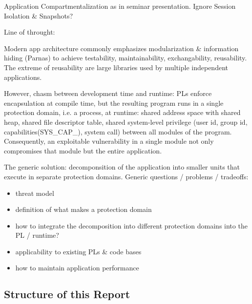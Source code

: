 \documentclass[10pt,twocolumn,letter]{article}
\begin{document}
Application Compartmentalization as in seminar presentation. Ignore Session Isolation \& Snapshots?

Line of throught:

Modern app architecture commonly emphasizes modularization \& information hiding (Parnas) to achieve testability, maintainability, exchangability, reusability.
The extreme of reusability are large libraries used by multiple independent applications.

However, chasm between development time and runtime:
PLs enforce encapsulation at compile time, but the resulting program runs in a single protection domain, i.e. a process, at runtime:
shared address space with shared heap, shared file descriptor table, shared system-level privilege (user id, group id, capabilities(SYS\_CAP\_), system call) between all modules of the program.
Consequently, an exploitable vulnerability in a single module not only compromises that module but the entire application.

The generic solution: decomponsition of the application into smaller units that execute in separate protection domains.
Generic questions / problems / tradeoffs:
\begin{itemize}
  \item threat model
  \item definition of what makes a protection domain
  \item how to integrate the decomposition into different protection domains into the PL / runtime?
  \item applicability to existing PLs \& code bases
  \item how to maintain application performance
\end{itemize}

\subsection{Structure of this Report}
\blindtext{}
\end{document}
